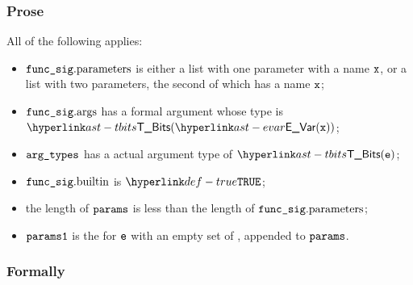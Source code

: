 \subsubsection{Prose}
All of the following applies:
\begin{itemize}
  \item $\funcsig.\funcparameters$ is either
    a list with one parameter with a name $\vx$,
    or a list with two parameters, the second of which has a name $\vx$\ProseTerminateAs{\params};
  \item $\funcsig.\funcargs$ has a \head{} formal argument whose type is $\TBits(\EVar(\vx))$\ProseTerminateAs{\params};
  \item $\argtypes$ has a \head{} actual argument type of $\TBits(\ve)$\ProseTerminateAs{\params};
  \item $\funcsig.\funcbuiltin$ is $\True$\ProseTerminateAs{\params};
  \item the length of $\params$ is less than the length of $\funcsig.\funcparameters$\ProseTerminateAs{\params};
  \item $\paramsone$ is the \constrainedinteger{} for $\ve$ with an empty set of \sideeffectdescriptorsterm,
        appended to $\params$\ProseTerminateAs{\params}.
\end{itemize}

\subsubsection{Formally}
\begin{mathpar}
\end{mathpar}

